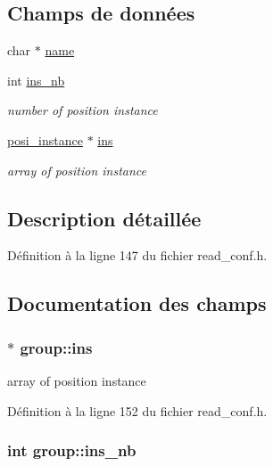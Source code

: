 \subsection*{Champs de données}
\begin{DoxyCompactItemize}
\item 
char $\ast$ \hyperlink{structgroup_a55a316cced9c73cc1778aa4554c383cc}{name}
\item 
int \hyperlink{structgroup_a7fcfe31c7d959576282d8546148f263f}{ins\+\_\+nb}
\begin{DoxyCompactList}\small\item\em number of position instance \end{DoxyCompactList}\item 
\hyperlink{read__conf_8h_ae233ac376b010d04519bd914edac5260}{posi\+\_\+instance} $\ast$ \hyperlink{structgroup_a8704d94395c07371f3b0d7ce1aeea8a3}{ins}
\begin{DoxyCompactList}\small\item\em array of position instance \end{DoxyCompactList}\end{DoxyCompactItemize}


\subsection{Description détaillée}


Définition à la ligne 147 du fichier read\+\_\+conf.\+h.



\subsection{Documentation des champs}
\hypertarget{structgroup_a8704d94395c07371f3b0d7ce1aeea8a3}{
\subsubsection[{ins}]{$\ast$ group\+::ins}}\label{structgroup_a8704d94395c07371f3b0d7ce1aeea8a3}


array of position instance 



Définition à la ligne 152 du fichier read\+\_\+conf.\+h.

\hypertarget{structgroup_a7fcfe31c7d959576282d8546148f263f}{
\subsubsection[{ins\+\_\+nb}]{\setlength{\rightskip}{0pt plus 5cm}int group\+::ins\+\_\+nb}}\label{structgroup_a7fcfe31c7d959576282d8546148f263f}


